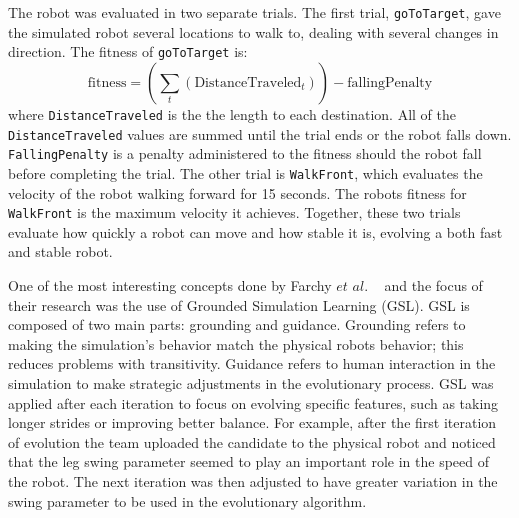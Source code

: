 \documentclass{sig-alternate}
\begin{document}
 The robot was evaluated in two separate trials. The first trial, {\tt goToTarget}, gave the simulated robot several locations to walk to, dealing with several changes in direction. The fitness of {\tt goToTarget} is:
\[
  \textrm{fitness} = (\sum_{t} (\textrm{DistanceTraveled}_t)) - \textrm{fallingPenalty}
\]where {\tt DistanceTraveled} is the the length to each destination. All of the {\tt DistanceTraveled} values are summed until the trial ends or the robot falls down. {\tt FallingPenalty} is a penalty administered to the fitness should the robot fall before completing the trial. The other trial is {\tt WalkFront}, which evaluates the velocity of the robot walking forward for 15 seconds. The robots fitness for {\tt WalkFront} is the maximum velocity it achieves. Together, these two trials evaluate how quickly a robot can move and how stable it is, evolving a both fast and stable robot.
  
  
  One of the most interesting concepts done by Farchy $et$ $al.$ ~\cite{Farchy:2013:HRL:2484920.2484930} and the focus of their research was the use of Grounded Simulation Learning (GSL). GSL is composed of two main parts: grounding and guidance. Grounding refers to making the simulation's behavior match the physical robots behavior; this reduces problems with transitivity. Guidance refers to human interaction in the simulation to make strategic adjustments in the evolutionary process. GSL was applied after each iteration to focus on evolving specific features, such as taking longer strides or improving better balance. For example, after the first iteration of evolution the team uploaded the candidate to the physical robot and noticed that the leg swing parameter seemed to play an important role in the speed of the robot. The next iteration was then adjusted to have greater variation in the swing parameter to be used in the evolutionary algorithm. 
\end{document}
